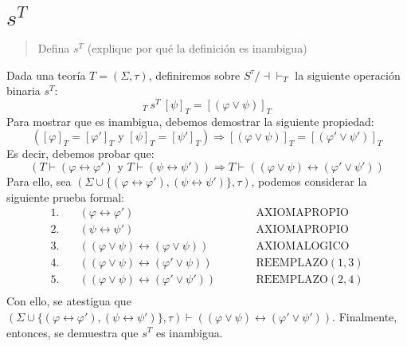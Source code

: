 \documentclass{article}
\begin{document}
\section{$s^T$}
\begin{quote}
  Defina $s^T$ (explique por qué la definición es inambigua)
\end{quote}
Dada una teoría $T=(\Sigma,\tau)$, definiremos sobre $S^\tau/\dashv\vdash_T$ la siguiente operación binaria $s^T$:
\begin{equation*}
  [\varphi]_T\ s^T\ [\psi]_T = [(\varphi\lor\psi)]_T
\end{equation*}
Para mostrar que es inambigua, debemos demostrar la siguiente propiedad:
\begin{equation*}
  ([\varphi]_T=[\varphi']_T\text{ y }[\psi]_T=[\psi']_T)\Rightarrow[(\varphi\lor\psi)]_T=[(\varphi'\lor\psi')]_T
\end{equation*}
Es decir, debemos probar que:
\begin{equation*}
  (T\vdash(\varphi\leftrightarrow\varphi')\text{ y }T\vdash(\psi\leftrightarrow\psi'))\Rightarrow T\vdash((\varphi\lor\psi)\leftrightarrow(\varphi'\lor\psi'))
\end{equation*}
Para ello, sea $(\Sigma\cup\{(\varphi\leftrightarrow\varphi'),(\psi\leftrightarrow\psi')\},\tau)$, podemos considerar la siguiente prueba formal:
\begin{equation*}
  \begin{alignedat}{2}
    1. & \quad (\varphi\leftrightarrow\varphi')                      &  & \qquad \text{AXIOMAPROPIO}   \\
    2. & \quad (\psi\leftrightarrow\psi')                            &  & \qquad \text{AXIOMAPROPIO}   \\
    3. & \quad ((\varphi\lor\psi)\leftrightarrow(\varphi\lor\psi))   &  & \qquad \text{AXIOMALOGICO}   \\
    4. & \quad ((\varphi\lor\psi)\leftrightarrow(\varphi'\lor\psi))  &  & \qquad \text{REEMPLAZO}(1,3) \\
    5. & \quad ((\varphi\lor\psi)\leftrightarrow(\varphi'\lor\psi')) &  & \qquad \text{REEMPLAZO}(2,4) \\
  \end{alignedat}
\end{equation*}
Con ello, se atestigua que $(\Sigma\cup\{(\varphi\leftrightarrow\varphi'),(\psi\leftrightarrow\psi')\},\tau)\vdash((\varphi\lor\psi)\leftrightarrow(\varphi'\lor\psi'))$.
\newline
Finalmente, entonces, se demuestra que $s^T$ es inambigua.
\end{document}
